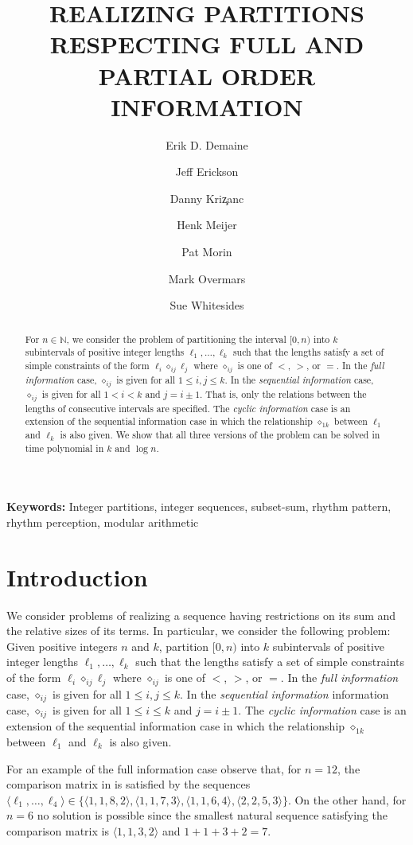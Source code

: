 \documentclass[11pt]{patmorin}
\title{\MakeUppercase{Realizing Partitions Respecting Full 
	and Partial Order Information}}
\author{
	Erik D. Demaine \and
	Jeff Erickson \and
	Danny Kri\c{z}anc \and
	Henk Meijer \and
	Pat Morin \and
	Mark Overmars \and
	Sue Whitesides
}
\date{}
\newcommand{\N}{\mathbb{N}}
\newcommand{\op}{\diamond}
\newcommand{\opij}{\op_{ij}}
\begin{document}
\maketitle

\begin{abstract} 
For $n\in\N$, we consider the problem of partitioning the interval
$[0,n)$ into $k$ subintervals of positive integer lengths
$\ell_1,\ldots,\ell_k$ such that the lengths satisfy a set of simple
constraints of the form $\ell_i \opij \ell_j$ where $\opij$ is one of
$<$, $>$, or $=$.  In the \emph{full information} case, $\opij$ is
given for all $1\le i,j\le k$.  In the \emph{sequential information}
case, $\opij$ is given for all $1< i< k$ and $j=i\pm 1$.
That is, only the relations between the lengths of consecutive
intervals are specified.  The \emph{cyclic information} case is an
extension of the sequential information case in which the 
relationship $\op_{1k}$ between $\ell_1$ and $\ell_k$ is also given.
We show that all three versions of the problem can be solved in time
polynomial in $k$ and $\log n$.
\end{abstract}

\noindent\textbf{Keywords:} Integer partitions, integer sequences,
subset-sum, rhythm pattern, rhythm perception, modular arithmetic

\section{Introduction}
We consider problems of realizing a sequence having restrictions on
its sum and the relative sizes of its terms.  In particular, we
consider the following problem:  Given positive integers $n$ and $k$,
partition $[0,n)$ into $k$ subintervals of positive integer lengths
$\ell_1,\ldots,\ell_k$ such that the lengths satisfy a set of simple
constraints of the form $\ell_i \opij \ell_j$ where $\opij$ is one of
$<$, $>$, or $=$.  In the \emph{full information} case, $\opij$ is
given for all $1\le i,j\le k$.  In the \emph{sequential information}
information case, $\opij$ is given for all $1\le i\le k$ and $j=i\pm
1$.  The \emph{cyclic information} case is an extension of the
sequential information case in which the relationship $\op_{1k}$
between $\ell_1$ and $\ell_k$ is also given. 

For an example of the full information case observe that, for $n=12$,
the comparison matrix in  is satisfied by the
sequences $\langle\ell_1,\ldots,\ell_4\rangle\in
\{\langle1,1,8,2\rangle, \langle1,1,7,3\rangle, \langle1,1,6,4\rangle,
\langle2,2,5,3\rangle\}$.  On the other hand, for $n=6$ no solution is
possible since the smallest natural sequence satisfying the comparison
matrix is $\langle1,1,3,2\rangle$ and $1+1+3+2=7$.
\end{document}
